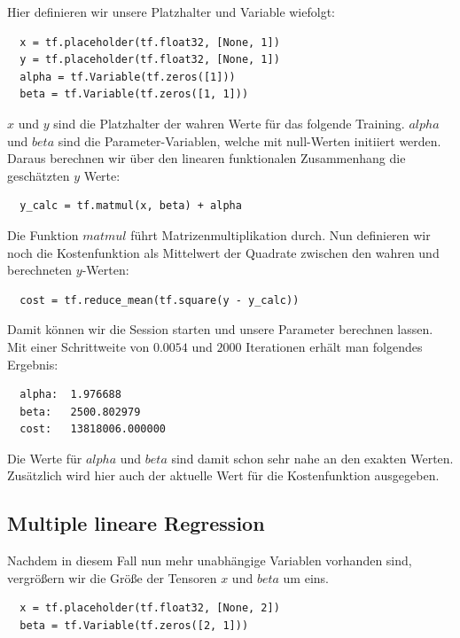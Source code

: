 Hier definieren wir unsere Platzhalter und Variable wiefolgt:

\begin{verbatim}
  x = tf.placeholder(tf.float32, [None, 1])
  y = tf.placeholder(tf.float32, [None, 1])
  alpha = tf.Variable(tf.zeros([1]))
  beta = tf.Variable(tf.zeros([1, 1]))
\end{verbatim}

$x$ und $y$ sind die Platzhalter der wahren Werte für das folgende Training. $alpha$ und $beta$ sind die Parameter-Variablen, welche mit null-Werten initiiert werden. Daraus berechnen wir über den linearen funktionalen Zusammenhang die geschätzten $y$ Werte:

\begin{verbatim}
  y_calc = tf.matmul(x, beta) + alpha
\end{verbatim}

Die Funktion $matmul$ führt Matrizenmultiplikation durch. Nun definieren wir noch die Kostenfunktion als Mittelwert der Quadrate zwischen den wahren und berechneten $y$-Werten:

\begin{verbatim}
  cost = tf.reduce_mean(tf.square(y - y_calc))
\end{verbatim}

Damit können wir die Session starten und unsere Parameter berechnen lassen. Mit einer Schrittweite von $0.0054$ und $2000$ Iterationen erhält man folgendes Ergebnis:

\begin{verbatim}
  alpha:  1.976688
  beta:   2500.802979
  cost:   13818006.000000
\end{verbatim}

Die Werte für $alpha$ und $beta$ sind damit schon sehr nahe an den exakten Werten. Zusätzlich wird hier auch der aktuelle Wert für die Kostenfunktion ausgegeben.

\subsection{Multiple lineare Regression}

Nachdem in diesem Fall nun mehr unabhängige Variablen vorhanden sind, vergrößern wir die Größe der Tensoren $x$ und $beta$ um eins.

\begin{verbatim}
  x = tf.placeholder(tf.float32, [None, 2])
  beta = tf.Variable(tf.zeros([2, 1]))
\end{verbatim}

